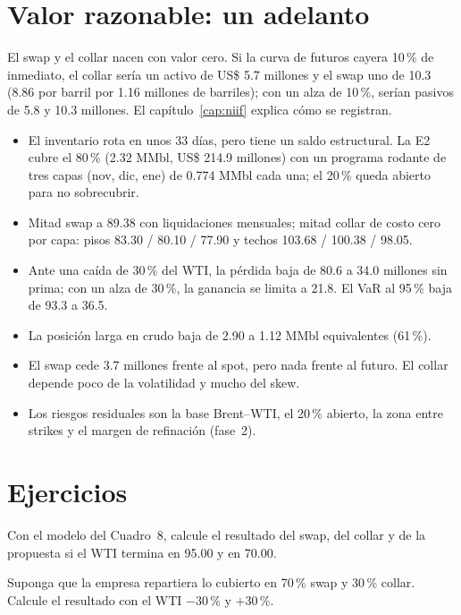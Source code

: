 \section{Valor razonable: un adelanto}

El swap y el collar nacen con valor cero. Si la curva de futuros cayera 10\,\% de inmediato, el collar sería un activo de US\$ 5.7 millones y el swap uno de 10.3 (8.86 por barril por 1.16 millones de barriles); con un alza de 10\,\%, serían pasivos de 5.8 y 10.3 millones. El capítulo~\ref{cap:niif} explica cómo se registran.

\begin{resumen}
\begin{itemize}
\item El inventario rota en unos 33 días, pero tiene un saldo estructural. La E2 cubre el 80\,\% (2.32 MMbl, US\$ 214.9 millones) con un programa rodante de tres capas (nov, dic, ene) de 0.774 MMbl cada una; el 20\,\% queda abierto para no sobrecubrir.
\item Mitad swap a 89.38 con liquidaciones mensuales; mitad collar de costo cero por capa: pisos 83.30 / 80.10 / 77.90 y techos 103.68 / 100.38 / 98.05.
\item Ante una caída de 30\,\% del WTI, la pérdida baja de 80.6 a 34.0 millones sin prima; con un alza de 30\,\%, la ganancia se limita a 21.8. El VaR al 95\,\% baja de 93.3 a 36.5.
\item La posición larga en crudo baja de 2.90 a 1.12 MMbl equivalentes (61\,\%).
\item El swap cede 3.7 millones frente al spot, pero nada frente al futuro. El collar depende poco de la volatilidad y mucho del skew.
\item Los riesgos residuales son la base Brent--WTI, el 20\,\% abierto, la zona entre strikes y el margen de refinación (fase~2).
\end{itemize}
\end{resumen}

\section*{Ejercicios}

\ejercicio[cálculo] Con el modelo del Cuadro~8, calcule el resultado del swap, del collar y de la propuesta si el WTI termina en 95.00 y en 70.00.

\ejercicio[cálculo] Suponga que la empresa repartiera lo cubierto en 70\,\% swap y 30\,\% collar. Calcule el resultado con el WTI $-30\,\%$ y $+30\,\%$.

